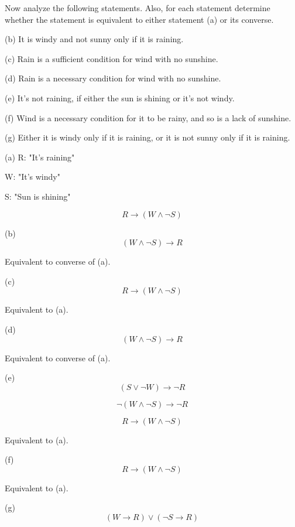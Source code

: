 \documentclass{article}
\begin{document}
Now analyze the following statements. Also, for each statement determine
whether the statement is equivalent to either statement (a) or its converse.

\hspace{12pt}(b) It is windy and not sunny only if it is raining.

\hspace{12pt}(c) Rain is a sufficient condition for wind with no sunshine.

\hspace{12pt}(d) Rain is a necessary condition for wind with no sunshine.

\hspace{12pt}(e) It’s not raining, if either the sun is shining or it’s not windy.

\hspace{12pt}(f) Wind is a necessary condition for it to be rainy, and so is a lack of
sunshine.

\hspace{12pt}(g) Either it is windy only if it is raining, or it is not sunny only if it is
raining.
\vspace{30pt}

(a) R: "It's raining"

W: "It's windy"

S: "Sun is shining"

$$R \to (W \land \neg S)$$
\vspace{20pt}

(b) $$(W \land \neg S) \to R$$

Equivalent to converse of (a).

(c) $$R \to (W \land \neg S)$$

Equivalent to (a).
\vspace{20pt}

(d) $$(W \land \neg S) \to R$$

Equivalent to converse of (a).
\vspace{20pt}

(e) $$(S \lor \neg W) \to \neg R$$

$$\neg (W \land \neg S) \to \neg R$$

$$R \to (W \land \neg S)$$

Equivalent to (a).
\vspace{20pt}

(f) $$R \to (W \land \neg S)$$

Equivalent to (a).
\vspace{20pt}

(g) $$(W \to R) \lor (\neg S \to R)$$
\end{document}
